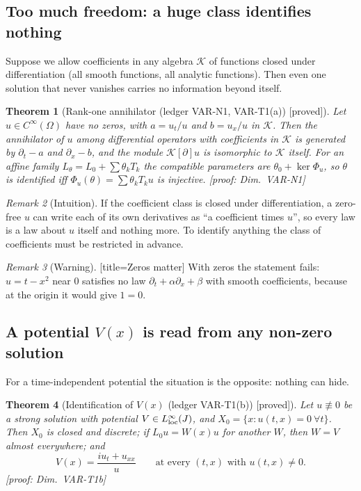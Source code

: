 \documentclass[11pt]{article}
\theoremstyle{plain}
\newtheorem{theorem}{Theorem}[section]
\theoremstyle{definition}
\theoremstyle{remark}
\newtheorem{remark}[theorem]{Remark}
\newcommand{\badge}[2]{\textcolor{#1}{\textsf{\footnotesize[#2]}}}
\newcommand{\proved}[1][]{\badge{cC}{proved#1}}
\newcommand{\led}[1]{\textcolor{cG}{\textsf{\footnotesize(ledger #1)}}}
\newenvironment{intuition}{\begin{remark}[Intuition]}{\end{remark}}
\newenvironment{caution}{\begin{remark}[Warning]}{\end{remark}}
\newcommand{\dimref}[1]{\textsf{\footnotesize[proof: Dim.~#1]}}
\begin{document}
\subsection{Too much freedom: a huge class identifies nothing}

Suppose we allow coefficients in any algebra $\mathcal K$ of functions closed under differentiation (all smooth functions, all analytic functions). Then even one solution that never vanishes carries no information beyond itself.

\begin{theorem}[{Rank-one annihilator \led{VAR-N1, VAR-T1(a)} \proved}]\label{thm:varn1}
Let $u\in C^\infty(\Omega)$ have no zeros, with $a=u_t/u$ and $b=u_x/u$ in $\mathcal K$. Then the annihilator of $u$ among differential operators with coefficients in $\mathcal K$ is generated by $\partial_t-a$ and $\partial_x-b$, and the module $\mathcal K[\partial]u$ is isomorphic to $\mathcal K$ itself. For an affine family $L_\theta=L_0+\sum\theta_kT_k$ the compatible parameters are $\theta_0+\ker\Phi_u$, so $\theta$ is identified iff $\Phi_u(\theta)=\sum\theta_kT_ku$ is injective.
\dimref{VAR-N1}
\end{theorem}

\begin{intuition}
If the coefficient class is closed under differentiation, a zero-free $u$ can write each of its own derivatives as ``a coefficient times $u$'', so every law is a law about $u$ itself and nothing more. To identify anything the class of coefficients must be restricted in advance.
\end{intuition}

\begin{caution}[title=Zeros matter]
With zeros the statement fails: $u=t-x^2$ near $0$ satisfies no law $\partial_t+\alpha\partial_x+\beta$ with smooth coefficients, because at the origin it would give $1=0$.
\end{caution}

\subsection{A potential $V(x)$ is read from any non-zero solution}

For a time-independent potential the situation is the opposite: nothing can hide.

\begin{theorem}[{Identification of $V(x)$ \led{VAR-T1(b)} \proved}]\label{thm:vart1b}
Let $u\not\equiv0$ be a strong solution with potential $V\in L^\infty_{\rm loc}(J)$, and $X_0=\{x:u(t,x)=0\ \forall t\}$. Then $X_0$ is closed and discrete; if $L_0u=W(x)u$ for another $W$, then $W=V$ almost everywhere; and
\[
V(x)=\frac{iu_t+u_{xx}}{u}\qquad\text{at every }(t,x)\text{ with }u(t,x)\ne0 .
\]
\dimref{VAR-T1b}
\end{theorem}
\end{document}
